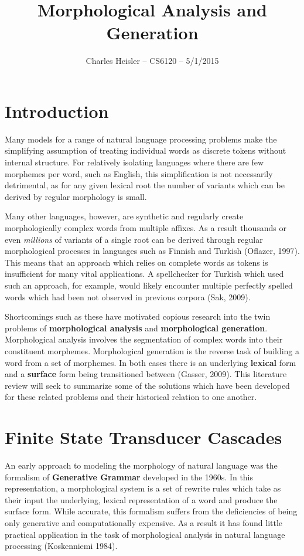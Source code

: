 \documentclass[12pt]{article}
\title{Morphological Analysis and Generation}
\author{Charles Heisler -- CS6120 -- 5/1/2015}
\date{}
\begin{document}
\maketitle

\section{Introduction}
Many models for a range of natural language processing problems make the simplifying assumption of treating individual words as discrete tokens without internal structure. For relatively isolating languages where there are few morphemes per word, such as English, this simplification is not necessarily detrimental, as for any given lexical root the number of variants which can be derived by regular morphology is small.

Many other languages, however, are synthetic and regularly create morphologically complex words from multiple affixes. As a result thousands or even \emph{millions} of variants of a single root can be derived through regular morphological processes in languages such as Finnish and Turkish (Oflazer, 1997). This means that an approach which relies on complete words as tokens is insufficient for many vital applications. A spellchecker for Turkish which used such an approach, for example, would likely encounter multiple perfectly spelled words which had been not observed in previous corpora (Sak, 2009).

Shortcomings such as these have motivated copious research into the twin problems of \textbf{morphological analysis} and \textbf{morphological generation}. Morphological analysis involves the segmentation of complex words into their constituent morphemes. Morphological generation is the reverse task of building a word from a set of morphemes. In both cases there is an underlying \textbf{lexical} form and a \textbf{surface} form being transitioned between (Gasser, 2009). This literature review will seek to summarize some of the solutions which have been developed for these related problems and their historical relation to one another.

\section{Finite State Transducer Cascades}
An early approach to modeling the morphology of natural language was the formalism of \textbf{Generative Grammar} developed in the 1960s. In this representation, a morphological system is a set of rewrite rules which take as their input the underlying, lexical representation of a word and produce the surface form. While accurate, this formalism suffers from the deficiencies of being only generative and computationally expensive. As a result it has found little practical application in the task of morphological analysis in natural language processing (Koskenniemi 1984).
\end{document}
